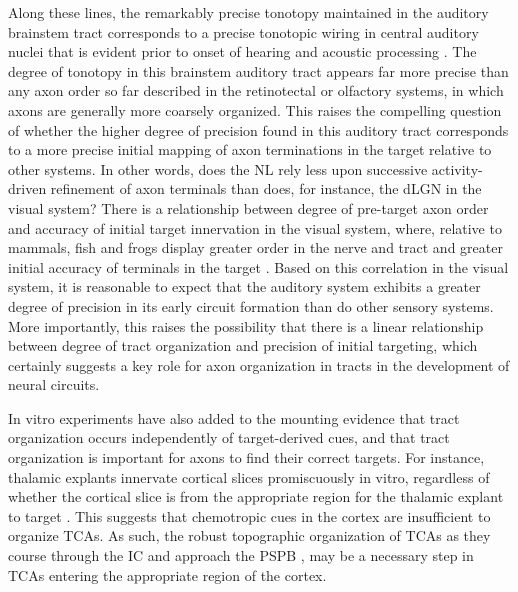 Along these lines, the remarkably precise tonotopy maintained in the auditory brainstem tract \cite{kashima2013pre} corresponds to a precise tonotopic wiring in central auditory nuclei that is evident prior to onset of hearing and acoustic processing \cite{appler2011connecting}.
The degree of tonotopy in this brainstem auditory tract appears far more precise than any axon order so far described in the retinotectal or olfactory systems, in which axons are generally more coarsely organized.
This raises the compelling question of whether the higher degree of precision found in this auditory tract corresponds to a more precise initial mapping of axon terminations in the target relative to other systems.
In other words, does the NL rely less upon successive activity-driven refinement of axon terminals than does, for instance, the dLGN in the visual system? 
There is a relationship between degree of pre-target axon order and accuracy of initial target innervation in the visual system, where, relative to mammals, fish and frogs display greater order in the nerve and tract and greater initial accuracy of terminals in the target \cite{simon1991relationship}.
Based on this correlation in the visual system, it is reasonable to expect that the auditory system exhibits a greater degree of precision in its early circuit formation than do other sensory systems.
More importantly, this raises the possibility that there is a linear relationship between degree of tract organization and precision of initial targeting, which certainly suggests a key role for axon organization in tracts in the development of neural circuits.

In vitro experiments have also added to the mounting evidence that tract organization occurs independently of target-derived cues, and that tract organization is important for axons to find their correct targets.
For instance, thalamic explants innervate cortical slices promiscuously in vitro, regardless of whether the cortical slice is from the appropriate region for the thalamic explant to target \cite{molnar1991lack}.
This suggests that chemotropic cues in the cortex are insufficient to organize TCAs. 
As such, the robust topographic organization of TCAs as they course through the IC and approach the PSPB \cite{molnar1998mechanisms}, may be a necessary step in TCAs entering the appropriate region of the cortex. 

